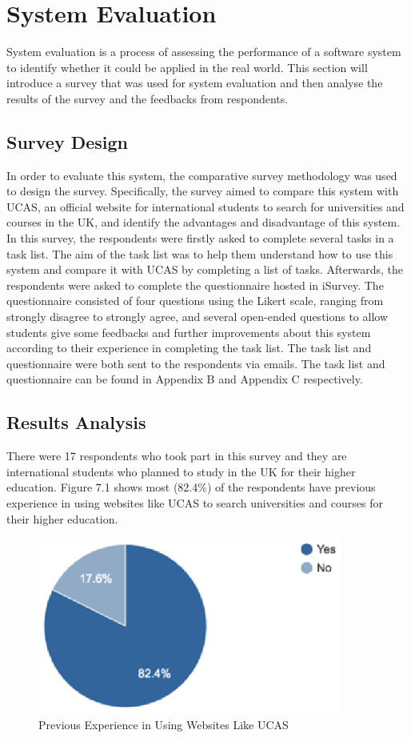\section{System Evaluation}

System evaluation is a process of assessing the performance of a software system to identify whether it could be applied in the real world. This section will introduce a survey that was used for system evaluation and then analyse the results of the survey and the feedbacks from respondents.


\subsection{Survey Design
}

In order to evaluate this system, the comparative survey methodology was used to design the survey. Specifically, the survey aimed to compare this system with UCAS, an official website for international students to search for universities and courses in the UK, and identify the advantages and disadvantage of this system. In this survey, the respondents were firstly asked to complete several tasks in a task list. The aim of the task list was to help them understand how to use this system and compare it with UCAS by completing a list of tasks. Afterwards, the respondents were asked to complete the questionnaire hosted in iSurvey. The questionnaire consisted of four questions using the Likert scale, ranging from strongly disagree to strongly agree, and several open-ended questions to allow students give some feedbacks and further improvements about this system according to their experience in completing the task list. The task list and questionnaire were both sent to the respondents via emails. The task list and questionnaire can be found in Appendix B and Appendix C respectively.


\subsection{Results Analysis}


There were 17 respondents who took part in this survey and they are international students who planned to study in the UK for their higher education. Figure 7.1 shows most (82.4\%) of the respondents have previous experience in using websites like UCAS to search universities and courses for their higher education. 


\begin{figure}[H]
  \centering
  \includegraphics[width=10cm]{./img/Picture29}
  \caption{Previous Experience in Using Websites Like UCAS
}
  \label{Figure:figex}
\end{figure}



